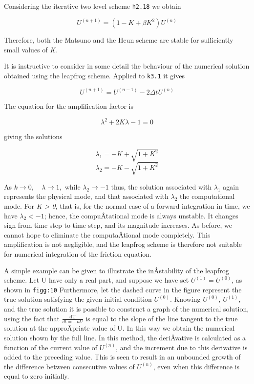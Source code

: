 Considering the iterative two level scheme \texttt{h2.18} we obtain

\[U^{\left( n + 1 \right)} = \left( 1 - K + \beta K^{2} \right)U^{\left( n \right)}\]

Therefore, both the Matsuno and the Heun scheme are stable for
sufficiently small values of \emph{K}.

It is instructive to consider in some detail the behaviour of the
numerical solution obtained using the leapfrog scheme. Applied to
\texttt{k3.1} it gives

\[U^{\left( n + 1 \right)} = U^{\left( n - 1 \right)} - 2\Delta t U^{\left( n \right)}\]

The equation for the amplification factor is

\[\lambda^{2} + 2K\lambda - 1 = 0\]

giving the solutions

\[\lambda_{1} = - K + \sqrt{1 + K^{2}}\]\[\lambda_{2} = - K - \sqrt{1 + K^{2}}\]

As \(k \rightarrow 0, \quad \lambda \rightarrow 1,\) while
\(\lambda_{2} \rightarrow - 1\) thus, the solution associated with
\(\lambda_{1}\) again represents the physical mode, and that associated
with \(\lambda_{2}\) the computational mode. For \emph{K \textgreater{}
0}, that is, for the normal case of a forward integration in time, we
have \(\lambda_{2} < - 1\); hence, the compuÂ­tational mode is always
unstable. It changes sign from time step to time step, and its magnitude
increases. As before, we cannot hope to eliminate the computaÂ­tional
mode completely. This amplification is not negligible, and the leapfrog
scheme is therefore not suitable for numerical integration of the
friction equation.

A simple example can be given to illustrate the inÂ­stability of the
leapfrog scheme. Let U have only a real part, and suppose we have set
\(U^{( 1 )} = U^{( 0 )}\), as shown in \texttt{figg:10} Furthermore, let
the dashed curve in the figure represent the true solution satisfying
the given initial condition \(U^{\left( 0 \right)}\). Knowing
\(U^{\left( 0 \right)}\), \(U^{\left( 1 \right)}\), and the true
solution it is possible to construct a graph of the numerical solution,
using the fact that \(\frac{\text{dU}}{dt = - \kappa U}\) is equal to
the slope of the line tangent to the true solution at the approÂ­priate
value of U. In this way we obtain the numerical solution shown by the
full line. In this method, the deriÂ­vative is calculated as a function
of the current value of \(U^{\left( n \right)}\), and the increment due
to this derivative is added to the preceding value. This is seen to
result in an unbounded growth of the difference between consecutive
values of \(U^{\left( n \right)}\), even when this difference is equal
to zero initially.

